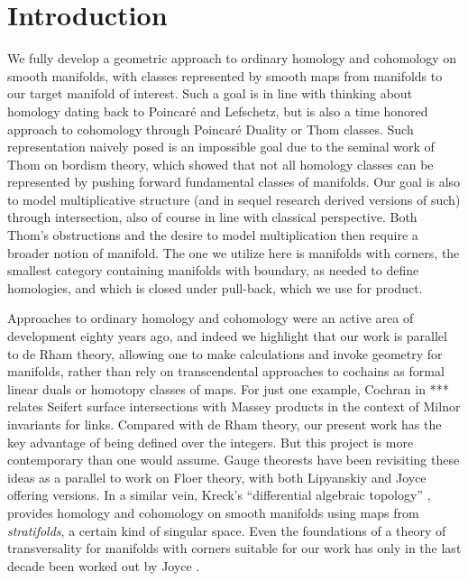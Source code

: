 
\section{Introduction}\label{intro}

We fully develop a geometric approach to ordinary homology and cohomology on smooth manifolds,
with  classes represented by smooth maps from manifolds to our target manifold of interest.  
Such a goal is in line with thinking about homology dating back to Poincar\'e and Lefschetz, but is also a time honored approach to cohomology
through Poincar\'e Duality or Thom classes.
Such representation naively posed is an impossible goal due to the seminal work of Thom on bordism theory, 
which showed that not all homology classes can be represented by pushing forward fundamental classes of manifolds.
Our goal is also to model multiplicative structure (and in sequel research derived versions of such) through intersection,  also of course
in line with classical perspective.  Both Thom's obstructions and the desire to model multiplication then require
 a broader notion of manifold.  The one we utilize here is manifolds with corners, the smallest category containing manifolds with boundary, as
 needed to define homologies, and which is closed under pull-back, which we use for product.
 
Approaches to ordinary homology and cohomology were an active area of development  eighty years ago, and indeed we highlight
that our work is parallel to de Rham theory, allowing one to make calculations and invoke geometry for manifolds, rather than rely on
 transcendental approaches
to cochains as formal linear duals or homotopy classes of maps.  For just one example, Cochran in *** relates Seifert surface intersections with
Massey products in the context of Milnor invariants for links.  
 Compared with de Rham theory, our present work has
 the key advantage of being defined over the integers.  But this 
project is more contemporary than one would assume.  Gauge theorests have been revisiting these ideas as a parallel to work on Floer
theory, with both Lipyanskiy  \cite{Lipy14} and Joyce \cite{Joyc15} offering versions.   In a similar vein, Kreck's
 ``differential algebraic topology'' \cite{Krec10},  provides homology and cohomology on smooth manifolds using maps from \textit{stratifolds}, 
 a certain kind of singular space.   Even the foundations of 
a  theory of transversality for manifolds with corners suitable for our work
has only in the last decade
been worked out by Joyce \cite{Joy12}.

